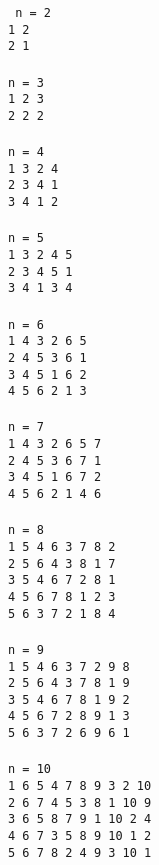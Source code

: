 \texttt{
n = 2\\
1 2\\
2 1\\
\\
n = 3\\
1 2 3 \\
2 2 2\\
\\
n = 4\\
1 3 2 4 \\
2 3 4 1\\
3 4 1 2\\
\\
n = 5\\
1 3 2 4 5 \\
2 3 4 5 1\\
3 4 1 3 4\\
\\
n = 6\\
1 4 3 2 6 5 \\
2 4 5 3 6 1\\
3 4 5 1 6 2\\
4 5 6 2 1 3\\
\\
n = 7\\
1 4 3 2 6 5 7 \\
2 4 5 3 6 7 1\\
3 4 5 1 6 7 2\\
4 5 6 2 1 4 6\\
\\
n = 8\\
1 5 4 6 3 7 8 2\\
2 5 6 4 3 8 1 7 \\
3 5 4 6 7 2 8 1\\
4 5 6 7 8 1 2 3\\
5 6 3 7 2 1 8 4\\
\\
n = 9\\
1 5 4 6 3 7 2 9 8\\
2 5 6 4 3 7 8 1 9 \\
3 5 4 6 7 8 1 9 2\\
4 5 6 7 2 8 9 1 3\\
5 6 3 7 2 6 9 6 1\\
\\
n = 10\\
1 6 5 4 7 8 9 3 2 10 \\
2 6 7 4 5 3 8 1 10 9\\
3 6 5 8 7 9 1 10 2 4\\
4 6 7 3 5 8 9 10 1 2\\
5 6 7 8 2 4 9 3 10 1\\
}
